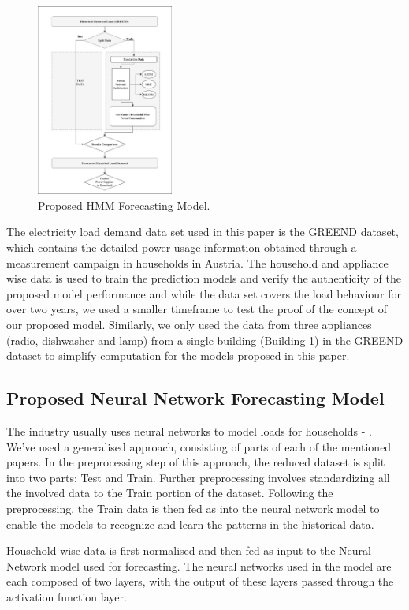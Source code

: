 \documentclass[conference]{IEEEtran}
\begin{document}
\begin{figure}[htbp]
  \centering
  \includegraphics[width=0.4\textwidth]{NN_Model.eps}
  \caption{Proposed HMM Forecasting Model.}
  \label{fig:nn_model}
\end{figure}

The electricity load demand data set used in this paper is the GREEND \cite{greend} dataset, which contains the detailed power usage information obtained through a measurement campaign in households in Austria. The household and appliance wise data is used to train the prediction models and verify the authenticity of the proposed model performance and while the data set covers the load behaviour for over two years, we used a smaller timeframe to test the proof of the concept of our proposed model. Similarly, we only used the data from three appliances (radio, dishwasher and lamp) from a single building (Building 1) in the GREEND dataset to simplify computation for the models proposed in this paper. 

\subsection{Proposed Neural Network Forecasting Model}
The industry usually uses neural networks to model loads for households \cite{generalnn1}- \cite{generalnn4}. We've used a generalised approach, consisting of parts of each of the mentioned papers. In the preprocessing step of this approach, the reduced dataset is split into two parts: Test and Train. Further preprocessing involves standardizing all the involved data to the Train portion of the dataset. Following the preprocessing, the Train data is then fed as into the neural network model to enable the models to recognize and learn the patterns in the historical data.

Household wise data is first normalised and then fed as input to the Neural Network model used for forecasting. The neural networks used in the model are each composed of two layers, with the output of these layers passed through the activation function layer. 
\end{document}
